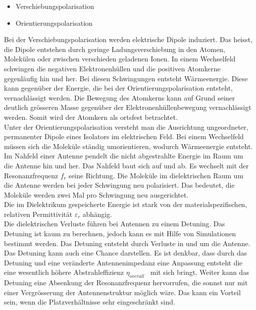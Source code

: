 \begin{itemize}
\item Verschiebungspolarisation
\item Orientierungspolarisation
\end{itemize}
Bei der Verschiebungspolarisation werden elektrische Dipole  induziert. Das heisst,  die Dipole entstehen durch geringe Ladungsverschiebung in den Atomen, Molekülen oder zwischen verschieden geladenen Ionen. In einem Wechselfeld schwingen die negativen Elektronenhüllen und die positiven Atomkerne gegenläufig hin und her.  Bei diesen Schwingungen entsteht  Wärmeenergie.  Diese kann gegenüber der Energie, die bei der Orientierungspolarisation entsteht,  vernachlässigt werden.  Die Bewegung des Atomkerns kann auf Grund seiner deutlich grösseren Masse  gegenüber der Elektronenhüllenbewegung vernachlässigt werden. Somit wird der Atomkern als ortsfest betrachtet. \\
Unter der Orientierungspolarisation versteht man die Ausrichtung ungeordneter, permanenter Dipole eines Isolators im elektrischen Feld. Bei einem Wechselfeld müssen sich die Moleküle ständig umorientieren, wodurch Wärmeenergie entsteht\cite{DielektrikumPolarisation}.\\
Im Nahfeld einer Antenne pendelt die nicht abgestrahlte Energie im Raum um die Antenne hin und her. Das Nahfeld baut sich auf und ab. Es wechselt  mit der Resonanzfrequenz $f_{r}$ seine Richtung. Die Moleküle im dielektrischen Raum um die Antenne werden bei jeder Schwingung neu polarisiert. Das bedeutet, die Moleküle werden zwei Mal pro Schwingung neu ausgerichtet.\\
Die im Dielektrikum gespeicherte Energie ist stark von der materialspezifischen, relativen Permittivität $\varepsilon_r $ abhängig.\\
Die dielektrischen Verluste führen bei Antennen  zu einem Detuning. Das Detuning ist kaum zu berechnen, jedoch kann es mit Hilfe von  Simulationen bestimmt werden. Das Detuning entsteht durch Verluste in und um die  Antenne.\\ 
Das Detuning kann auch eine Chance darstellen. Es ist denkbar, dass durch das Detuning und eine veränderte Antennenimpedanz eine Anpassung  entsteht die  eine wesentlich höhere Abstrahleffizienz $\eta_{overall}$ \ mit sich bringt. Weiter kann das Detuning eine Absenkung der Resonanzfrequenz hervorrufen, die sonnst nur mit einer Vergrösserung der Antennenstruktur möglich wäre. Das kann ein Vorteil sein, wenn die Platzverhältnisse sehr eingeschränkt sind.\\
